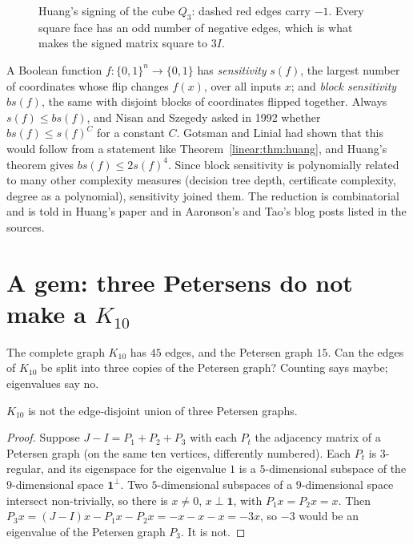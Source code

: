 \begin{figure}[ht]
\centering
{}
\caption{Huang's signing of the cube $Q_3$: dashed red edges carry $-1$. Every square face has an odd number of negative edges,
which is what makes the signed matrix square to $3I$.}
\label{linear:fig:huang}
\end{figure}

\begin{remark}
A Boolean function $f:\{0,1\}^n\to\{0,1\}$ has \emph{sensitivity} $s(f)$, the largest number of coordinates whose flip changes
$f(x)$, over all inputs $x$; and \emph{block sensitivity} $bs(f)$, the same with disjoint blocks of coordinates flipped together.
Always $s(f)\le bs(f)$, and Nisan and Szegedy asked in 1992 whether $bs(f)\le s(f)^C$ for a constant $C$. Gotsman and Linial had
shown that this would follow from a statement like Theorem~\ref{linear:thm:huang}, and Huang's theorem gives $bs(f)\le2s(f)^4$. Since block
sensitivity is polynomially related to many other complexity measures (decision tree depth, certificate complexity, degree as a
polynomial), sensitivity joined them. The reduction is combinatorial and is told in Huang's paper and in Aaronson's and Tao's blog
posts listed in the sources.
\end{remark}

\section{A gem: three Petersens do not make a $K_{10}$}

The complete graph $K_{10}$ has $45$ edges, and the Petersen graph $15$. Can the edges of $K_{10}$ be split into three copies of the
Petersen graph? Counting says maybe; eigenvalues say no.

\begin{proposition}[Schwenk]\label{linear:prop:schwenk}
$K_{10}$ is not the edge-disjoint union of three Petersen graphs.
\end{proposition}
\begin{proof}
Suppose $J-I=P_1+P_2+P_3$ with each $P_t$ the adjacency matrix of a Petersen graph (on the same ten vertices, differently numbered).
Each $P_t$ is $3$-regular, and its eigenspace for the eigenvalue $1$ is a $5$-dimensional subspace of the $9$-dimensional space $\mathbf
1^\perp$. Two $5$-dimensional subspaces of a $9$-dimensional space intersect non-trivially, so there is $x\ne0$, $x\perp\mathbf 1$,
with $P_1x=P_2x=x$. Then $P_3x=(J-I)x-P_1x-P_2x=-x-x-x=-3x$, so $-3$ would be an eigenvalue of the Petersen graph $P_3$. It is not.
\end{proof}


